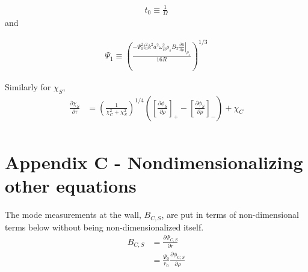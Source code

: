 \documentclass{article}
\begin{document}
\begin{equation} \label{wessonCurrentProfile}
\begin{split}
t_0 \equiv \frac{1}{\Omega}
\end{split} 
\end{equation} 
and

\begin{equation} \label{wessonCurrentProfile}
\begin{split}
\Psi_1 \equiv  \left( \frac{-\Psi_0^2 t_0^2 k^2 a^2 \omega_R^2 \rho_s B_T \left.\frac{\partial \mu}{\partial \rho}\right|_{\rho_s}}{16R} \right ) ^{1/3}
\end{split} 
\end{equation}

Similarly for $\chi_S$, 
\begin{equation} \label{wessonCurrentProfile}
\begin{split}
\frac{\partial \chi_S}{\partial \tau} & =     \left(  \frac{1}{\chi_C^2+\chi_S^2} \right)^{1/4}  \left( \left[\frac{\partial \phi_S}{\partial \rho}\right]_{+}-\left[\frac{\partial \phi_S}{\partial \rho}\right]_{-}    \right) + \chi_C\\
\end{split} 
\end{equation}  

\section*{Appendix C - Nondimensionalizing other equations}

The mode measurements at the wall, $B_{C,S}$, are put in terms of non-dimensional terms below without being non-dimensionalized itself. 
\begin{equation} \label{wessonCurrentProfile}
\begin{split}
B_{C,S} &= \frac{\partial \Psi_{C,S}}{\partial r} \\
 &= \frac{\Psi_0}{r_0}\frac{\partial \phi_{C,S}}{\partial \rho} \\
\end{split} 
\end{equation}  
\end{document}
